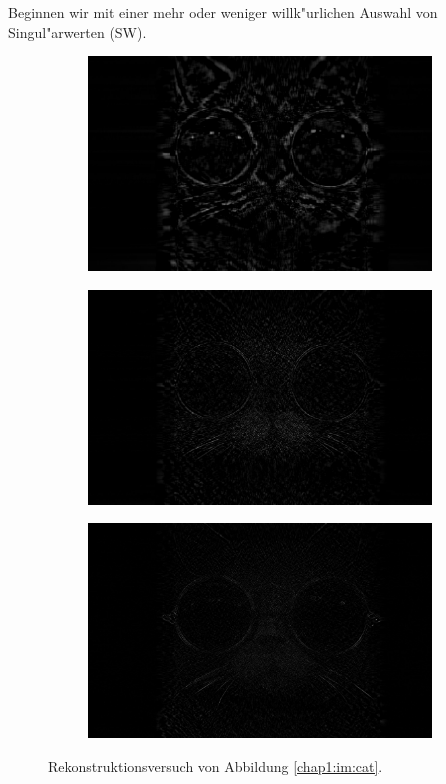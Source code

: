 Beginnen wir mit einer mehr oder weniger willk"urlichen Auswahl von Singul"arwerten (SW).

\begin{figure}[h!]
\center
\begin{subfigure}[c]{.3\textwidth}
\includegraphics[width=.9\linewidth]{images/Cat10-30}
\end{subfigure}
\begin{subfigure}[c]{.3\textwidth}
\includegraphics[width=.9\linewidth]{images/Cat40-90}
\end{subfigure}
\begin{subfigure}[c]{.3\textwidth}
\includegraphics[width=.9\linewidth]{images/Cat100-400}
\end{subfigure}

\caption{Rekonstruktionsversuch von Abbildung \ref{chap1:im:cat}.}\label{chap1:im:catinterval}
\end{figure}

